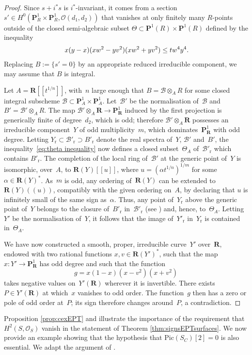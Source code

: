 \documentclass[JEP,XML,SOM,Unicode]{cedram}
\newcommand{\lpr}{(\!(}
\newcommand{\rpr}{)\!)}
\newcommand{\lcr}{[\![}
\newcommand{\rcr}{]\!]}
\theoremstyle{plain}
\theoremstyle{definition}
\numberwithin{equation}{section}
\newcommand{\rs}{{\mathrm{r}}}
\newcommand{\sB}{{\mathscr B}}
\newcommand{\sO}{{\mathscr O}}
\renewcommand{\P}{{\mathbf P}}
\newcommand{\R}{{\mathbf R}}
\newcommand{\Pic}{\mathrm{Pic}}
\begin{document}
\begin{proof}
Since $s+i^*s$ is $i^*$-invariant, it comes from a
section $s'\in H^0(\P^1_R\times\P^1_R,\sO(d_1,d_2))$ that vanishes at only finitely many
$R$\nobreakdash-points outside of the closed semi-algebraic subset
$\Theta \subset \P^1(R)\times \P^1(R)$
defined by the inequality
\begin{equation}
\label{eq:theta inequality}
x(y-x)(xw^2-yv^2)(xw^2+yv^2)\leq tw^4y^4\rlap{.}
\end{equation}
Replacing $B:=\{s'=0\}$ by an appropriate reduced irreducible component, we
may assume that $B$ is integral.

Let $A=\R\lcr t^{1/n}\rcr$, with~$n$ large enough that
$B=\sB\otimes_A R$ for some closed integral
subscheme $\sB \subset \P^1_A \times \P^1_A$.
Let~$\sB'$ be the normalisation of~$\sB$ and $B'=\sB'\otimes_AR$.
The map $\sB'\otimes_A \R \to \P^1_\R$ induced by the first projection
is generically finite of degree~$d_2$, which is odd;
therefore $\sB' \otimes_A \R$ possesses an irreducible component~$Y$ of odd multiplicity~$m$,
which dominates~$\P^1_\R$ with odd degree.
Letting $Y_\rs \subset \sB'_\rs \supset B'_\rs$ denote the real spectra of~$Y$, $\sB'$
and~$B'$,
the inequality~\eqref{eq:theta inequality} now defines a closed subset~$\Theta_A$ of~$\sB'_\rs$
which contains $B'_\rs$.
The completion of the local ring of~$\sB'$ at the generic point of~$Y$ is isomorphic,
over~$A$, to $\R(Y)\lcr u\rcr$, where $u=(\alpha t^{1/n})^{1/m}$ for some $\alpha \in \R(Y)^*$.
As~$m$ is odd,
any ordering of~$\R(Y)$ can be extended to $\R(Y)\lpr u\rpr$, compatibly with the given ordering on~$A$,
by declaring that $u$ is infinitely small of the same sign as~$\alpha$.
Thus, any point of~$Y_\rs$ above the generic point of~$Y$ belongs to the closure of~$B'_\rs$ in~$\sB'_\rs$
(see \cite[Prop.\,7.1.21]{bcr}) and, hence, to~$\Theta_A$.
Letting~$Y'$ be the normalisation of~$Y$, it follows that the image of~$Y'_\rs$ in~$Y_\rs$
is contained in~$\Theta_A$.

We have now constructed a smooth, proper, irreducible curve~$Y'$ over~$\R$, endowed with two rational
functions $x,v \in \R(Y')^*$, such that the map $x:Y'\to \P^1_\R$ has odd degree and such that
the function
\[
g=x(1-x)(x-v^2)(x+v^2)
\]
takes negative values on~$Y'(\R)$
wherever it is invertible.
There exists $P \in Y'(\R)$ at which~$x$ vanishes to odd order.
The function~$g$ then has a zero or pole of odd order at~$P$; its
sign therefore changes around~$P$, a contradiction.
\end{proof}

Proposition \ref{prop:cexEPT} and \cite[Ex.\,15.2.2]{bcr} illustrate the importance of the requirement that $H^2(S,\sO_S)$ vanish in the statement of Theorem \ref{thm:signsEPTsurfaces}. We now provide an example showing that the hypothesis that $\Pic(S_C)[2]=0$ is also essential. We adapt the argument of \cite[Ex.\,15.2.2]{bcr}.
\end{document}
